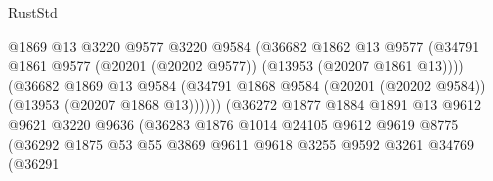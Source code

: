 \begin{lexlean}{RustStd}
\begin{coremodule}
                                          @1869
                                          @13
                                          @3220
                                          @9577
                                          @3220
                                          @9584
                                          (@36682
                                            @1862
                                            @13
                                            @9577
                                            (@34791
                                              @1861
                                              @9577
                                              (@20201 (@20202 @9577))
                                              (@13953 (@20207 @1861 @13))))
                                          (@36682
                                            @1869
                                            @13
                                            @9584
                                            (@34791
                                              @1868
                                              @9584
                                              (@20201 (@20202 @9584))
                                              (@13953 (@20207 @1868 @13))))))
                                      (@36272
                                        @1877
                                        @1884
                                        @1891
                                        @13
                                        @9612
                                        @9621
                                        @3220
                                        @9636
                                        (@36283
                                          @1876
                                          @1014
                                          @24105
                                          @9612
                                          @9619
                                          @8775
                                          (@36292
                                            @1875
                                            @53
                                            @55
                                            @3869
                                            @9611
                                            @9618
                                            @3255
                                            @9592
                                            @3261
                                            @34769
                                            (@36291

\end{coremodule}
\end{lexlean}
